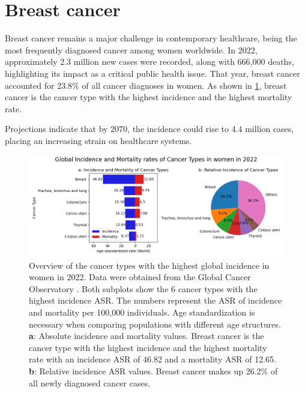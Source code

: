 \section{Breast cancer}
\label{sec:brca}

Breast cancer remains a major challenge in contemporary healthcare, being the
most frequently diagnosed cancer among women worldwide.
In 2022, approximately 2.3 million new cases were recorded, along with 666,000
deaths, highlighting its impact as a critical public health issue.
That year, breast cancer accounted for 23.8\% of all cancer diagnoses in
women\supercite{bray_global_2024,ferlay_global_2024}.
As shown in \cref{fig:brca_incidence_mortality}, breast cancer is the cancer
type with the highest incidence and the highest mortality rate.

Projections indicate that by 2070, the incidence could rise to 4.4 million
cases, placing an increasing strain on healthcare
systems\supercite{lei_global_2021}.

\begin{figure}[ht]
    \centering

    \includegraphics[width=\textwidth]{chapters/2_background/figures/incidence.png}
    \caption{Overview of the cancer types with the highest global incidence in
        women in 2022.
        Data were obtained from the Global Cancer Observatory
        \supercite{bray_global_2024,ferlay_global_2024}.
        Both subplots show the 6 cancer types with the highest incidence ASR.
        The numbers represent the ASR of incidence and mortality per 100,000
        individuals.
        Age standardization is necessary when comparing populations with different age
        structures\supercite{segi_age-adjusted_1960,doll_cancer_1966}.
        \textbf{a}: Absolute incidence and mortality values.
        Breast cancer is the cancer type with the highest incidence and the highest
        mortality rate with an incidence ASR of 46.82 and a mortality ASR of 12.65.
        \textbf{b}: Relative incidence ASR values.
        Breast cancer makes up 26.2\% of all newly diagnosed cancer cases.
    } \label{fig:brca_incidence_mortality}
\end{figure}

